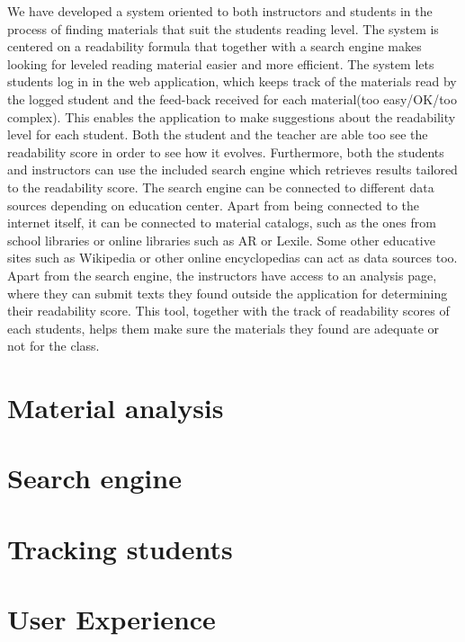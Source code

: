 \documentclass{sig-alternate-05-2015}
\begin{document}
We have developed a system oriented to both instructors and students in the process of finding materials that suit the students reading level. The system is centered on a readability formula that together with a search engine makes looking for leveled reading material easier and more efficient. The system lets students log in in the web application, which keeps track of the materials read by the logged student and the feed-back received for each material(too easy/OK/too complex). This enables the application to make suggestions about the readability level for each student. Both the student and the teacher are able too see the readability score in order to see how it evolves. Furthermore, both the students and instructors can use the included search engine which retrieves results tailored to the readability score. The search engine can be connected to different data sources depending on education center. Apart from being connected to the internet itself, it can be connected to material catalogs, such as the ones from school libraries or online libraries such as AR or Lexile. Some other educative sites such as Wikipedia or other online encyclopedias can act as data sources too. \\

Apart from the search engine, the instructors have access to an analysis page, where they can submit texts they found outside the application for determining their readability score. This tool, together with the track of readability scores of each students, helps them make sure the materials they found are adequate or not for the class.




\section{Material analysis}


\section{Search engine}


\section{Tracking students}

\section{User Experience}
\end{document}
